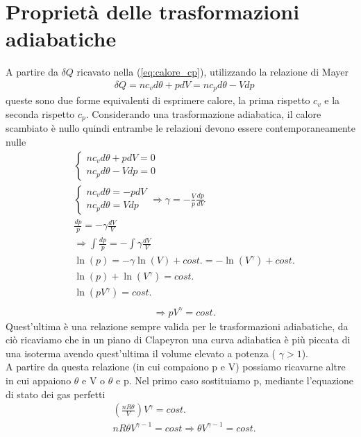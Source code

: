 \documentclass[
10pt, %
a4paper, %
oneside, %
headinclude,footinclude, %
BCOR5mm, %
]{scrartcl}
\begin{document}
\section{Proprietà delle trasformazioni adiabatiche}\label{sec:trasformazioni_adiabatiche}
A partire da $\delta Q$ ricavato nella (\ref{eq:calore_cp}), utilizzando la relazione di Mayer 
\begin{align*}
	&\delta Q = n c_v d\theta + pdV = n c_p d\theta - Vdp 
\end{align*}
queste sono due forme equivalenti di esprimere calore, la prima rispetto \(c_v\) e la seconda rispetto \(c_p\). Considerando una trasformazione adiabatica, il calore scambiato è nullo quindi entrambe le relazioni devono essere contemporaneamente nulle
\begin{align*}
	&\begin{cases}
		n c_v d\theta +pdV=0\\
		n c_p d\theta - V dp=0
	\end{cases}\\
	&\begin{cases}
		n c_v d\theta =-pdV\\
		n c_p d\theta = V dp
	\end{cases} \Rightarrow \gamma = - \frac{V}{p}\frac{dp}{dV}\\
	& \frac{dp}{p} = -\gamma \frac{dV}{V} \\
	&\Rightarrow \int\frac{dp}{p} = -\int\gamma \frac{dV}{V}\\
	&\ln(p) = -\gamma \ln(V) + cost. = -\ln(V^{\gamma}) + cost.\\
	&\ln(p)+\ln(V^{\gamma}) = cost.\\
	&\ln(pV^{\gamma}) = cost.\\
\end{align*}
\begin{align}\label{eq:adiabatica1}
	&\Rightarrow pV^{\gamma} = cost.
\end{align}
Quest'ultima è una relazione sempre valida per le trasformazioni adiabatiche, da ciò ricaviamo che in un piano di Clapeyron una curva adiabatica è più piccata di una isoterma avendo quest'ultima il volume elevato a potenza ( \(\gamma > 1\)).\\
A partire da questa relazione (in cui compaiono p e V) possiamo ricavarne altre in cui appaiono \(\theta\) e V o \(\theta\) e p. Nel primo caso sostituiamo p, mediante l'equazione di stato dei gas perfetti
\begin{align}\label{eq:adiabatica2}
	&\left(\frac{n R \theta}{V}\right)V^{\gamma} = cost.\nonumber\\
	&n R \theta V^{\gamma - 1} = cost \Rightarrow \theta V ^{\gamma-1}= cost.
\end{align}
\end{document}
